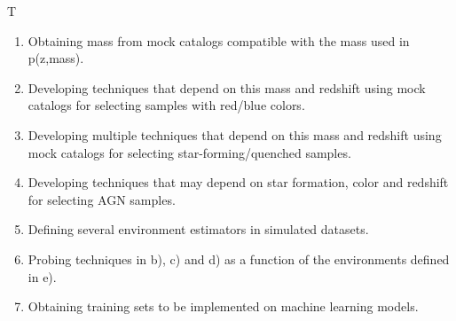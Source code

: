 \begin{tasklist}{T}
\begin{task}
{\begin{enumerate}
\item Obtaining mass from mock catalogs compatible with the mass used in p(z,mass).
\item Developing techniques that depend on this mass and redshift using mock catalogs for selecting samples with red/blue colors.
\item Developing multiple techniques that depend on this mass and redshift using mock catalogs for selecting star-forming/quenched samples. 
\item Developing techniques that may depend on star formation, color and redshift for selecting AGN samples.
\item Defining several environment estimators in simulated datasets.
\item Probing techniques in b), c) and d) as a function of the environments defined in e).
\item Obtaining training sets to be implemented on machine learning models.
\end{enumerate}
}
\end{task}
\end{tasklist}


